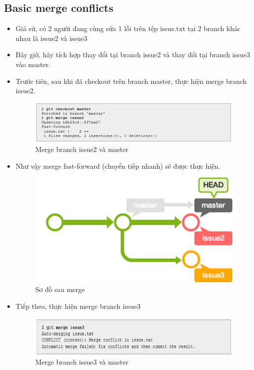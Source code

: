 \documentclass[12pt,a4paper]{report}
\begin{document}
\subsection{Basic merge conflicts}
\begin{itemize}
\item Giả sử, có 2 người đang cùng sửa 1 lỗi trên tệp issue.txt tại 2 branch khác nhau là issue2 và issue3	
\item Bây giờ, hãy tích hợp thay đổi tại branch issue2 và thay đổi tại branch issue3 vào master.
\item Trước tiên, sau khi đã checkout trên branch master, thực hiện merge branch issue2.	

\begin{figure}[!ht]
	\centering
	\includegraphics[width=0.8\linewidth]{screenshot03}
\caption{Merge branch issue2 và master}
	\label{fig:screenshot03}
	\end{figure}
	
\item Như vậy merge fast-forward (chuyển tiếp nhanh) sẽ được thực hiện.	

\begin{figure}[!ht]
	\centering
	\includegraphics[width=0.8\linewidth]{screenshot063}
\caption{Sơ đồ sau merge}
	\label{fig:screenshot063}
	\end{figure}
	
\item Tiếp theo, thực hiện merge branch issue3	

\begin{figure}[!ht]
	\centering
	\includegraphics[width=0.8\linewidth]{screenshot04}
\caption{Merge branch issue3 và master}
	\label{fig:screenshot04}
	\end{figure}


\end{itemize}
\end{document}

